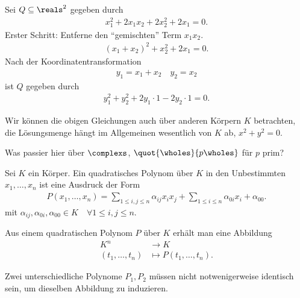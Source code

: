 \begin{beispiele*}
    Sei \( Q\subseteq \reals^2 \) gegeben durch
    \begin{align*}
        x_1^2+2x_1x_2+2x_2^2+2x_1=0.
    \end{align*}
    Erster Schritt: Entferne den \enquote{gemischten} Term \( x_1 x_2 \).
    \begin{align*}
        (x_1+x_2)^2+x_2^2+2x_1=0.
    \end{align*}
    Nach der Koordinatentransformation
    \begin{align*}
        y_1=x_1+x_2\quad y_2=x_2
    \end{align*}
    ist \( Q \) gegeben durch
    \begin{align*}
        y_1^2+y_2^2+2y_1\cdot 1-2y_2\cdot 1=0.
    \end{align*}
\end{beispiele*}
\begin{bemerkung*}
    Wir können die obigen Gleichungen auch über anderen Körpern \( K \) betrachten, die Lösungsmenge hängt im Allgemeinen wesentlich von \( K \) ab, \zb \( x^2+y^2=0 \).
    \begin{frage*}
        Was passier hier über \( \complexs \), \( \quot{\wholes}{p\wholes} \) für \( p \) prim?
    \end{frage*}
\end{bemerkung*}
\begin{definition*}
    Sei \( K  \) ein Körper. Ein quadratisches Polynom über \( K \) in den Unbestimmten \( x_1,\dotsc, x_n \) ist eine Ausdruck der Form
    \begin{align*}
        P(x_1,\dotsc, x_n)=\sum_{1\leq i, j\leq n} \alpha_{ij}x_i x_j+\sum_{1\leq i\leq n} \alpha_{0i} x_i+\alpha_{00}.
    \end{align*} 
    mit \( \alpha_{ij},\alpha_{0i}, \alpha_{00}\in K \quad \forall 1\leq i,j\leq n \).
\end{definition*}
\begin{bemerkung*}
    Aus einem quadratischen Polynom \( P \) über \( K \) erhält man eine Abbildung
    \begin{align*}
        K^n&\to K\\
        (t_1,\dotsc,t_n)&\mapsto P(t_1,\dotsc,t_n).
    \end{align*}
\end{bemerkung*}
\begin{achtung*}
    Zwei unterschiedliche Polynome \( P_1,P_2 \) müssen nicht notwenigerweise identisch sein, um dieselben Abbildung zu induzieren.
\end{achtung*}
